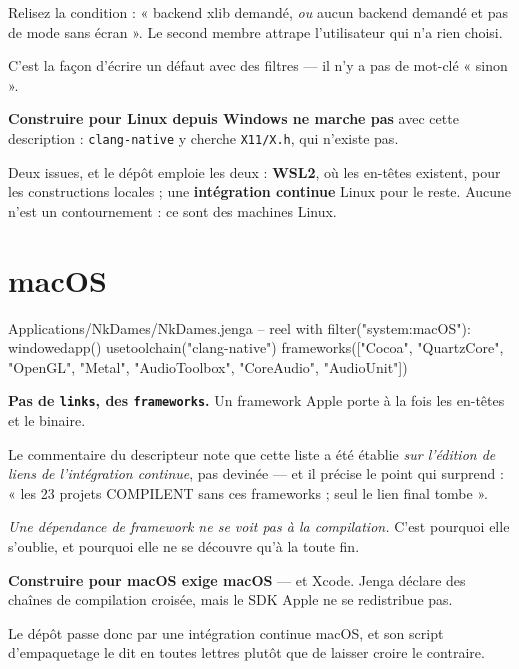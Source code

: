 \begin{nkretenir}
Relisez la condition : « backend xlib demandé, \emph{ou} aucun backend demandé et
pas de mode sans écran ». Le second membre attrape l'utilisateur qui n'a rien
choisi.

C'est la façon d'écrire un défaut avec des filtres --- il n'y a pas de mot-clé
« sinon ».
\end{nkretenir}

\begin{nkpiege}
\textbf{Construire pour Linux depuis Windows ne marche pas} avec cette
description : \texttt{clang-native} y cherche \texttt{X11/X.h}, qui n'existe pas.

Deux issues, et le dépôt emploie les deux : \textbf{WSL2}, où les en-têtes
existent, pour les constructions locales ; une \textbf{intégration continue}
Linux pour le reste. Aucune n'est un contournement : ce sont des machines Linux.
\end{nkpiege}

\section{macOS}

\begin{nkcode}{Applications/NkDames/NkDames.jenga -- reel}
with filter("system:macOS"):
    windowedapp()
    usetoolchain("clang-native")
    frameworks(["Cocoa", "QuartzCore", "OpenGL", "Metal",
                "AudioToolbox", "CoreAudio", "AudioUnit"])
\end{nkcode}

\begin{nkretenir}
\textbf{Pas de \texttt{links}, des \texttt{frameworks}.} Un framework Apple porte
à la fois les en-têtes et le binaire.

Le commentaire du descripteur note que cette liste a été établie \emph{sur
l'édition de liens de l'intégration continue}, pas devinée --- et il précise le
point qui surprend : « les 23 projets COMPILENT sans ces frameworks ; seul le
lien final tombe ».

\emph{Une dépendance de framework ne se voit pas à la compilation.} C'est
pourquoi elle s'oublie, et pourquoi elle ne se découvre qu'à la toute fin.
\end{nkretenir}

\begin{nkpiege}
\textbf{Construire pour macOS exige macOS} --- et Xcode. Jenga déclare des
chaînes de compilation croisée, mais le SDK Apple ne se redistribue pas.

Le dépôt passe donc par une intégration continue macOS, et son script
d'empaquetage le dit en toutes lettres plutôt que de laisser croire le
contraire.
\end{nkpiege}

